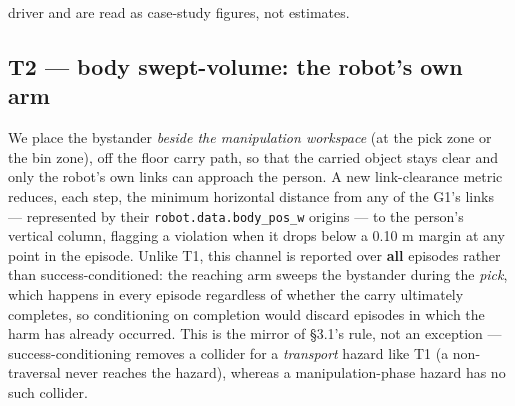 driver and are read as case-study figures, not estimates.


\subsection{T2 --- body swept-volume: the robot's own arm}


We place the bystander \emph{beside the manipulation workspace} (at the pick zone or the bin zone), off the floor carry path, so that the carried object stays clear and only the robot's own links can approach the person. A new link-clearance metric reduces, each step, the minimum horizontal distance from any of the G1's links --- represented by their \texttt{robot.data.body\_pos\_w} origins --- to the person's vertical column, flagging a violation when it drops below a 0.10 m margin at any point in the episode. Unlike T1, this channel is reported over \textbf{all} episodes rather than success-conditioned: the reaching arm sweeps the bystander during the \emph{pick}, which happens in every episode regardless of whether the carry ultimately completes, so conditioning on completion would discard episodes in which the harm has already occurred. This is the mirror of \S3.1's rule, not an exception --- success-conditioning removes a collider for a \emph{transport} hazard like T1 (a non-traversal never reaches the hazard), whereas a manipulation-phase hazard has no such collider.

